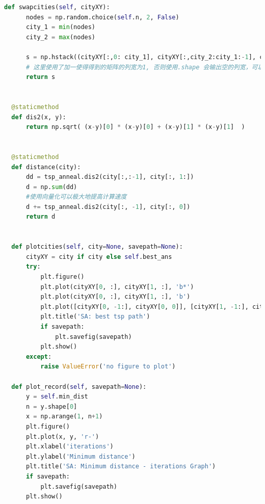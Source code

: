 \documentclass[12pt]{article}
\begin{document}
\begin{lstlisting}[language = Python, caption = SA算法计算TSP问题的类]
  def swapcities(self, cityXY):
      nodes = np.random.choice(self.n, 2, False)
      city_1 = min(nodes)
      city_2 = max(nodes)

      s = np.hstack((cityXY[:,0: city_1], cityXY[:,city_2:city_1:-1], cityXY[:,city_1:city_1 + 1], cityXY[:,city_2 + 1:]))
      # 这里使用了加一使得得到的矩阵的列宽为1, 否则使用.shape 会输出空的列宽，可以防止hstack 报错 'dimention 不一致'
      return s

  
  @staticmethod
  def dis2(x, y):
      return np.sqrt( (x-y)[0] * (x-y)[0] + (x-y)[1] * (x-y)[1]  )


  @staticmethod
  def distance(city):
      dd = tsp_anneal.dis2(city[:,:-1], city[:, 1:])
      d = np.sum(dd)
      #使用向量化可以极大地提高计算速度
      d += tsp_anneal.dis2(city[:, -1], city[:, 0])
      return d


  def plotcities(self, city=None, savepath=None):
      cityXY = city if city else self.best_ans
      try:
          plt.figure()
          plt.plot(cityXY[0, :], cityXY[1, :], 'b*')
          plt.plot(cityXY[0, :], cityXY[1, :], 'b')
          plt.plot([cityXY[0, -1:], cityXY[0, 0]], [cityXY[1, -1:], cityXY[1, 0]], 'b')
          plt.title('SA: best tsp path')
          if savepath:
              plt.savefig(savepath)
          plt.show()
      except:
          raise ValueError('no figure to plot')

  def plot_record(self, savepath=None):
      y = self.min_dist
      n = y.shape[0]
      x = np.arange(1, n+1)
      plt.figure()
      plt.plot(x, y, 'r-')
      plt.xlabel('iterations')
      plt.ylabel('Minimum distance')
      plt.title('SA: Minimum distance - iterations Graph')
      if savepath:
          plt.savefig(savepath)
      plt.show()
\end{lstlisting}
\end{document}
